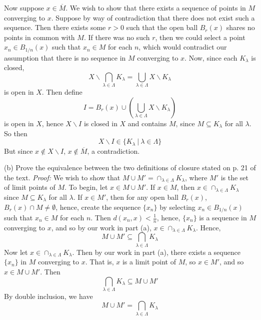 \documentclass{article}
\begin{document}
\begin{itemize}
    Now suppose $x \in \overline{M}$. We wish to show that there exists a sequence of points in $M$ converging to $x$. Suppose by way of contradiction that there does not exist such a sequence. 
    Then there exists some $r > 0$ such that the open ball $B_r(x)$ shares no points in common with $M$. If there was no such $r$, then we could select a point $x_n \in B_{1/n}(x)$ such that $x_n \in M$ for each $n$, which would contradict our assumption that there is no sequence in $M$ converging to $x$. 
    Now, since each $K_{\lambda}$ is closed,
    \[X \backslash \bigcap_{\lambda\in\Lambda} K_{\lambda} = \bigcup_{\lambda \in \Lambda} X \backslash K_{\lambda}\]
    is open in $X$. Then define
    \[I = B_r(x) \cup \left(\bigcup_{\lambda \in \Lambda} X \backslash K_{\lambda}\right)\]
    is open in $X$, hence $X \backslash I$ is closed in $X$ and contains $M$, since $M \subseteq K_{\lambda}$ for all $\lambda$. So then 
    \[X\backslash I \in \{K_{\lambda} \: | \: \lambda \in \Lambda\}\]
    But since $x \notin X\backslash I$, $x \notin \overline{M}$, a contradiction.
    \newline\newline

    
    (b) Prove the equivalence between the two definitions of closure stated on p. 21 of the text.
    \newline\newline
    \textit{Proof:} We wish to show that $M \cup M' = \cap_{\lambda \in \Lambda} K_{\lambda}$, where $M'$ is the set of limit points of $M$. To begin, let $x \in M\cup M'$. If $x \in M$, then $x \in \cap_{\lambda \in \Lambda} K_{\lambda}$ since $M \subseteq K_{\lambda}$ for all $\lambda$. 
    If $x \in M'$, then for any open ball $B_r(x)$, $B_r(x) \cap M \neq \emptyset$, hence, create the sequence $\{x_n\}$ by selecting $x_n \in B_{1/n}(x)$ such that $x_n \in M$ for each $n$. 
    Then $d(x_n,x) < \tfrac{1}{n}$, hence, $\{x_n\}$ is a sequence in $M$ converging to $x$, and so by our work in part (a), $x \in \cap_{\lambda \in \Lambda} K_{\lambda}$. 
    Hence,
    \[M\cup M' \subseteq \bigcap_{\lambda \in \Lambda} K_{\lambda}\]
    Now let $x \in \cap_{\lambda \in \Lambda} K_{\lambda}$. Then by our work in part (a), there exists a sequence $\{x_n\}$ in $M$ converging to $x$. That is, $x$ is a limit point of $M$, so $x \in M'$, and so $x \in M \cup M'$. Then
    \[\bigcap_{\lambda \in \Lambda} K_{\lambda} \subseteq M\cup M'\]
    By double inclusion, we have
    \[M\cup M' = \bigcap_{\lambda \in \Lambda} K_{\lambda}\]

    
\end{itemize}
\end{document}
